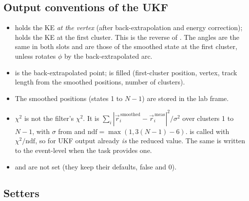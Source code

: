 \subsection{Output conventions of the UKF}

\begin{itemize}
\item {} holds the KE \emph{at the vertex} (after back-extrapolation and energy correction);
   holds the KE at the first cluster. This is the reverse of . The angles are
  the same in both slots and are those of the smoothed state at the first cluster, unless
   rotates $\phi$ by the back-extrapolated arc.
\item {} is the back-extrapolated point;  is filled (first-cluster
  position, vertex, track length from the smoothed positions, number of clusters).
\item The smoothed positions (states 1 to $N-1$) are stored in the lab frame.
\item $\chi^2$ is not the filter's $\chi^2$. It is $\sum_i |\vec r_i^{\,\mathrm{smoothed}} - \vec r_i^{\,\mathrm{meas}}|^2
  / \sigma^2$ over clusters 1 to $N-1$, with $\sigma$ from  and
  $\mathrm{ndf}=\max(1, 3(N-1)-6)$.  is called with $\chi^2/\mathrm{ndf}$, so for UKF output
   already \emph{is} the reduced value. The same is written to the event-level 
  when the task provides one.
\item {} and  are not set (they keep their defaults, false and 0).
\end{itemize}

\subsection{Setters}

